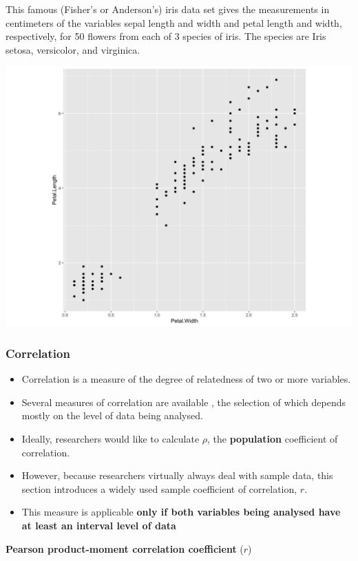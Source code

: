 \documentclass[]{book}
\providecommand{\tightlist}{%
  \setlength{\itemsep}{0pt}\setlength{\parskip}{0pt}}
\begin{document}
This famous (Fisher's or Anderson's) iris data set gives the measurements in centimeters of the variables sepal length and width and petal length and width, respectively, for 50 flowers from each of 3 species of iris. The species are Iris setosa, versicolor, and virginica.

\begin{center}\includegraphics[width=0.8\linewidth]{figure/scatterplot-1} \end{center}

\hypertarget{correlation}{%
\subsubsection{Correlation}\label{correlation}}

\begin{itemize}
\tightlist
\item
  Correlation is a measure of the degree of relatedness of two or more variables.
\item
  Several measures of correlation are available , the selection of which depends mostly on the level of data being analysed.
\item
  Ideally, researchers would like to calculate \(\rho\), the \textbf{population} coefficient of correlation.
\item
  However, because researchers virtually always deal with sample data, this section introduces a widely used sample coefficient of correlation, \(r\).
\item
  This measure is applicable \textbf{only if both variables being analysed have at least an interval level of data}
\end{itemize}

\textbf{Pearson product-moment correlation coefficient} (\(r\))
\end{document}
